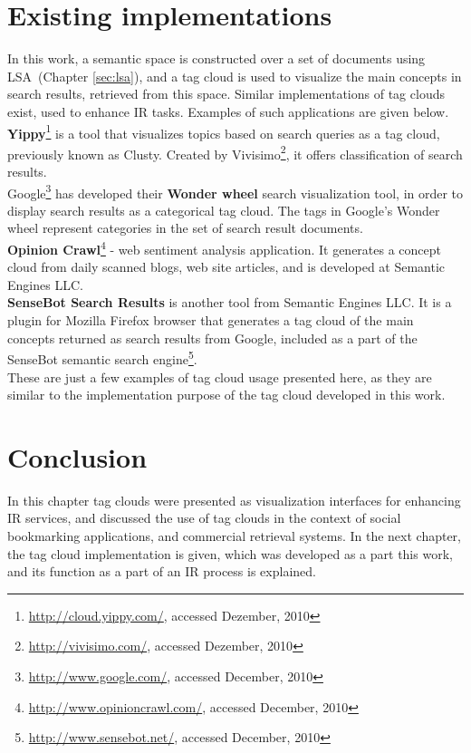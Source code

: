 \section{Existing implementations}
In this work, a semantic space is constructed over a set of documents using \gls{LSA}~(Chapter \ref{sec:lsa}), and a tag cloud is used to visualize the main concepts in search results, retrieved from this space. Similar implementations of tag clouds exist, used to enhance \gls{IR} tasks. Examples of such applications are given below. \\

\textbf{Yippy}\footnote{\url{http://cloud.yippy.com/}, accessed Dezember, 2010} is a tool that visualizes topics based on search queries as a tag cloud, previously known as Clusty. Created by Vivisimo\footnote{\url{http://vivisimo.com/}, accessed Dezember, 2010}, it offers classification of search results. \\

Google\footnote{\url{http://www.google.com/}, accessed December, 2010} has developed their \textbf{Wonder wheel} search visualization tool, in order to display search results as a categorical tag cloud. The tags in Google's Wonder wheel represent categories in the set of search result documents. \\ 

\textbf{Opinion Crawl}\footnote{\url{http://www.opinioncrawl.com/}, accessed December, 2010} - web sentiment analysis application. It generates a concept cloud from daily scanned blogs, web site articles, and is developed at Semantic Engines LLC.\\

\textbf{SenseBot Search Results} is another tool from Semantic Engines LLC. It is a plugin for Mozilla Firefox browser that generates a tag cloud of the main concepts returned as search results from Google, included as a part of the SenseBot semantic search engine\footnote{\url{http://www.sensebot.net/}, accessed December, 2010}.\\

These are just a few examples of tag cloud usage presented here, as they are similar to the implementation purpose of the tag cloud developed in this work.  \\


\section{Conclusion}
In this chapter tag clouds were presented as visualization interfaces for enhancing \gls{IR} services, and discussed the use of tag clouds in the context of social bookmarking applications, and commercial retrieval systems. In the next chapter, the tag cloud implementation is given, which was developed as a part this work, and its function as a part of an \nopagebreak \gls{IR} process is explained. \\



